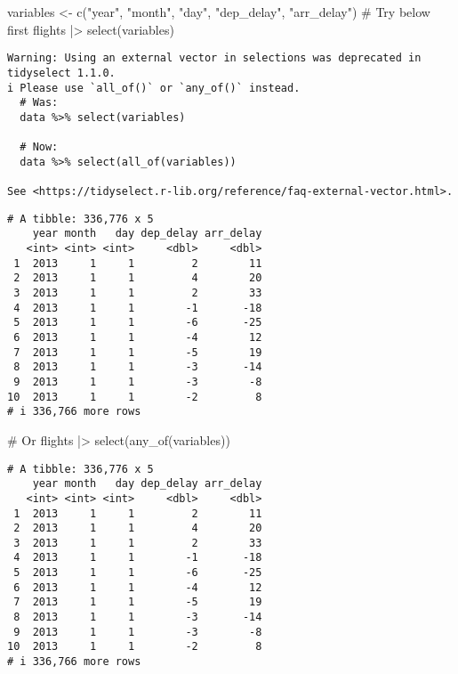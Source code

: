 \documentclass[
  letterpaper,
  DIV=11,
  numbers=noendperiod]{scrreprt}
\newenvironment{Shaded}{\begin{snugshade}}{\end{snugshade}}
\newcommand{\CommentTok}[1]{\textcolor[rgb]{0.37,0.37,0.37}{#1}}
\newcommand{\FunctionTok}[1]{\textcolor[rgb]{0.28,0.35,0.67}{#1}}
\newcommand{\NormalTok}[1]{\textcolor[rgb]{0.00,0.23,0.31}{#1}}
\newcommand{\OtherTok}[1]{\textcolor[rgb]{0.00,0.23,0.31}{#1}}
\newcommand{\SpecialCharTok}[1]{\textcolor[rgb]{0.37,0.37,0.37}{#1}}
\newcommand{\StringTok}[1]{\textcolor[rgb]{0.13,0.47,0.30}{#1}}
\begin{document}
\begin{enumerate}
\begin{Shaded}
\begin{Highlighting}[]
\NormalTok{variables }\OtherTok{\textless{}{-}} \FunctionTok{c}\NormalTok{(}\StringTok{"year"}\NormalTok{, }\StringTok{"month"}\NormalTok{, }\StringTok{"day"}\NormalTok{, }\StringTok{"dep\_delay"}\NormalTok{, }\StringTok{"arr\_delay"}\NormalTok{)}
\CommentTok{\# Try below first}
\NormalTok{flights }\SpecialCharTok{|\textgreater{}} 
  \FunctionTok{select}\NormalTok{(variables)}
\end{Highlighting}
\end{Shaded}

\begin{verbatim}
Warning: Using an external vector in selections was deprecated in tidyselect 1.1.0.
i Please use `all_of()` or `any_of()` instead.
  # Was:
  data %>% select(variables)

  # Now:
  data %>% select(all_of(variables))

See <https://tidyselect.r-lib.org/reference/faq-external-vector.html>.
\end{verbatim}

\begin{verbatim}
# A tibble: 336,776 x 5
    year month   day dep_delay arr_delay
   <int> <int> <int>     <dbl>     <dbl>
 1  2013     1     1         2        11
 2  2013     1     1         4        20
 3  2013     1     1         2        33
 4  2013     1     1        -1       -18
 5  2013     1     1        -6       -25
 6  2013     1     1        -4        12
 7  2013     1     1        -5        19
 8  2013     1     1        -3       -14
 9  2013     1     1        -3        -8
10  2013     1     1        -2         8
# i 336,766 more rows
\end{verbatim}

\begin{Shaded}
\begin{Highlighting}[]
\CommentTok{\# Or}
\NormalTok{flights }\SpecialCharTok{|\textgreater{}} 
  \FunctionTok{select}\NormalTok{(}\FunctionTok{any\_of}\NormalTok{(variables))}
\end{Highlighting}
\end{Shaded}

\begin{verbatim}
# A tibble: 336,776 x 5
    year month   day dep_delay arr_delay
   <int> <int> <int>     <dbl>     <dbl>
 1  2013     1     1         2        11
 2  2013     1     1         4        20
 3  2013     1     1         2        33
 4  2013     1     1        -1       -18
 5  2013     1     1        -6       -25
 6  2013     1     1        -4        12
 7  2013     1     1        -5        19
 8  2013     1     1        -3       -14
 9  2013     1     1        -3        -8
10  2013     1     1        -2         8
# i 336,766 more rows
\end{verbatim}


\end{enumerate}
\end{document}
